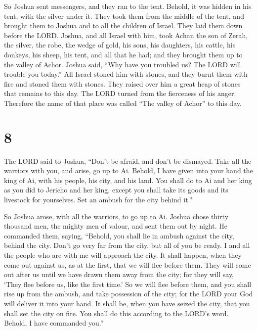  So Joshua sent messengers, and they ran to the tent.
Behold, it was hidden in his tent, with the silver under it.
 They took them from the middle of the tent, and brought
them to Joshua and to all the children of Israel. They laid them down
before the LORD.  Joshua, and all Israel with him, took
Achan the son of Zerah, the silver, the robe, the wedge of gold, his
sons, his daughters, his cattle, his donkeys, his sheep, his tent, and
all that he had; and they brought them up to the valley of Achor.
 Joshua said, ``Why have you troubled us? The LORD will
trouble you today.'' All Israel stoned him with stones, and they burnt
them with fire and stoned them with stones.  They raised
over him a great heap of stones that remains to this day. The LORD
turned from the fierceness of his anger. Therefore the name of that
place was called ``The valley of Achor'' to this day.

\hypertarget{section-7}{%
\section{8}\label{section-7}}

 The LORD said to Joshua, ``Don't be afraid, and don't be
dismayed. Take all the warriors with you, and arise, go up to Ai.
Behold, I have given into your hand the king of Ai, with his people, his
city, and his land.  You shall do to Ai and her king as you
did to Jericho and her king, except you shall take its goods and its
livestock for yourselves. Set an ambush for the city behind it.''

 So Joshua arose, with all the warriors, to go up to Ai.
Joshua chose thirty thousand men, the mighty men of valour, and sent
them out by night.  He commanded them, saying, ``Behold, you
shall lie in ambush against the city, behind the city. Don't go very far
from the city, but all of you be ready.  I and all the
people who are with me will approach the city. It shall happen, when
they come out against us, as at the first, that we will flee before
them.  They will come out after us until we have drawn them
away from the city; for they will say, `They flee before us, like the
first time.' So we will flee before them,  and you shall
rise up from the ambush, and take possession of the city; for the LORD
your God will deliver it into your hand.  It shall be, when
you have seized the city, that you shall set the city on fire. You shall
do this according to the LORD's word. Behold, I have commanded you.''

